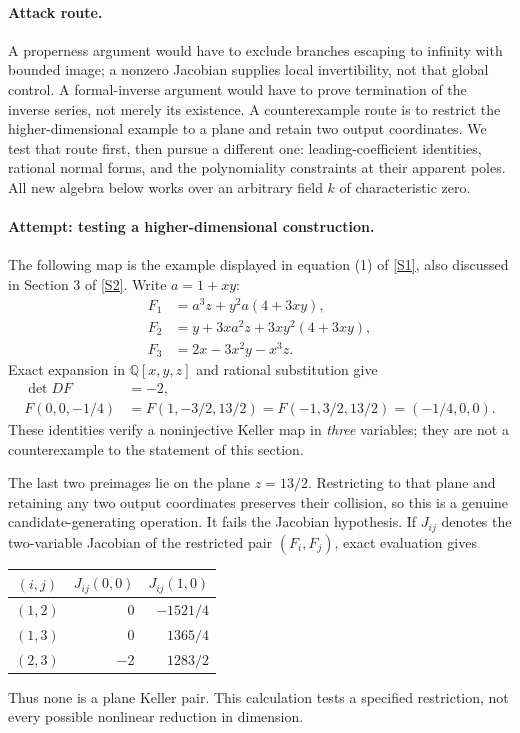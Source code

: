 \documentclass[11pt]{article}
\newcommand{\Q}{\mathbb{Q}}
\newcommand{\sref}[2]{\hyperlink{source:#1:#2}{[S#2]}}
\begin{document}
\paragraph{Attack route.}
A properness argument would have to exclude branches escaping to infinity
with bounded image; a nonzero Jacobian supplies local invertibility, not that
global control. A formal-inverse argument would have to prove termination of
the inverse series, not merely its existence. A counterexample route is to
restrict the higher-dimensional example to a plane and retain two output
coordinates. We test that route first, then pursue a different one:
leading-coefficient identities, rational normal forms, and the polynomiality
constraints at their apparent poles. All new algebra below works over an
arbitrary field $k$ of characteristic zero.

\paragraph{Attempt: testing a higher-dimensional construction.}
The following map is the example displayed in equation (1) of
\sref{103}{1}, also discussed in Section 3 of \sref{103}{2}. Write $a=1+xy$:
\begin{equation}\label{ra103:threeD}
 \begin{aligned}
 F_1&=a^3z+y^2a(4+3xy),\\
 F_2&=y+3xa^2z+3xy^2(4+3xy),\\
 F_3&=2x-3x^2y-x^3z.
 \end{aligned}
\end{equation}
Exact expansion in $\Q[x,y,z]$ and rational substitution give
\begin{align*}
 \det DF&=-2,\\
 F(0,0,-1/4)&=F(1,-3/2,13/2)=F(-1,3/2,13/2)
              =(-1/4,0,0).
\end{align*}
These identities verify a noninjective Keller map in \emph{three} variables;
they are not a counterexample to the statement of this section.

The last two preimages lie on the plane $z=13/2$. Restricting to that plane
and retaining any two output coordinates preserves their collision, so this
is a genuine candidate-generating operation. It fails the Jacobian
hypothesis. If $J_{ij}$ denotes the two-variable Jacobian of the restricted
pair $(F_i,F_j)$, exact evaluation gives
\begin{center}
\begin{tabular}{c|r r}
$(i,j)$ & $J_{ij}(0,0)$ & $J_{ij}(1,0)$\\
\hline
$(1,2)$ & $0$ & $-1521/4$\\
$(1,3)$ & $0$ & $1365/4$\\
$(2,3)$ & $-2$ & $1283/2$
\end{tabular}
\end{center}
Thus none is a plane Keller pair. This calculation tests a specified
restriction, not every possible nonlinear reduction in dimension.
\end{document}
